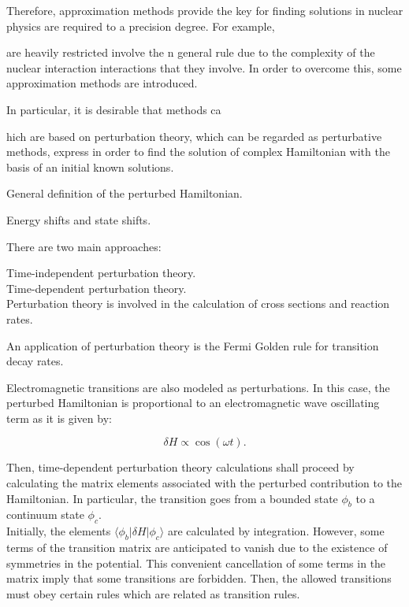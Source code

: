 \documentclass[openany]{book}
\begin{document}
Therefore, approximation methods provide the key for finding solutions in nuclear physics are required to a precision degree. For example, 

are heavily restricted  involve the n  general rule due to the complexity of the nuclear interaction interactions that they involve. In order to overcome this, some approximation methods are introduced.

In particular, it is desirable that methods ca 


hich are based on perturbation theory, which can be regarded as perturbative methods, express   in order to find the solution of complex Hamiltonian with the basis of an initial known solutions.

General definition of the perturbed Hamiltonian.



Energy shifts and state shifts. 

There are two main approaches: 

Time-independent perturbation theory.\\

Time-dependent perturbation theory.\\

Perturbation theory is involved in the calculation of cross sections and reaction rates.

An application of perturbation theory is the Fermi Golden rule for transition decay rates. 

Electromagnetic transitions are also modeled as perturbations. In this case, the perturbed Hamiltonian is proportional to an electromagnetic wave oscillating term as it is given by:

\begin{equation} \label{eq:perturbationTheory_radiativeTransition}
	\delta H \propto \cos(\omega t).
\end{equation}

Then, time-dependent perturbation theory calculations shall proceed by calculating the matrix elements associated with the perturbed contribution to the Hamiltonian. In particular, the transition goes from a bounded state $\phi_b$ to a  continuum state $\phi_c$.  \\

Initially, the elements $\langle \phi_b | \delta H| \phi_c \rangle$ are calculated by integration. However, some terms of the transition matrix are anticipated to vanish due to the existence of symmetries in the potential. This convenient cancellation of some terms in the matrix imply that some transitions are forbidden. Then, the allowed transitions must obey certain rules which are related as transition rules. \\
\end{document}
